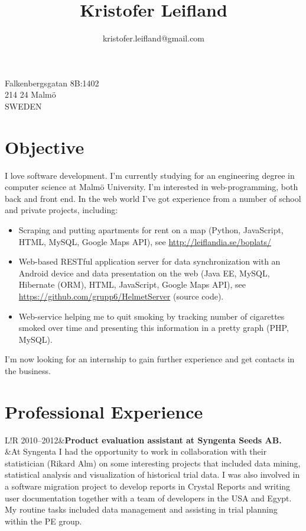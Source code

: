 \documentclass[10pt]{article}
\title{\bfseries\Huge Kristofer Leifland}
\author{kristofer.leifland@gmail.com}
\date{}
\newcommand\VRule{\color{lightgray}\vrule width 0.5pt}
\begin{document}
\maketitle
\thispagestyle{empty}
\pagestyle{empty}
\begin{minipage}[ht]{0.48\textwidth}
Falkenbergsgatan 8B:1402\\
214 24 Malmö\\
SWEDEN
\end{minipage}


\section*{Objective}
I love software development. I'm currently studying for an engineering degree in computer science at Malmö University. I'm interested in web-programming, both back and front end. In the web world I've got experience from a number of school and private projects, including:
\begin{itemize}
\item Scraping and putting apartments for rent on a map (Python, JavaScript, HTML, MySQL, Google Maps API), see \url{http://leiflandia.se/boplats/}
\item Web-based RESTful application server for data synchronization with an Android device and data presentation on the web (Java EE, MySQL, Hibernate (ORM), HTML, JavaScript, Google Maps API), see \url{https://github.com/grupp6/HelmetServer} (source code).
\item Web-service helping me to quit smoking by tracking number of cigarettes smoked over time and presenting this information in a pretty graph (PHP, MySQL).
\end{itemize}
I'm now looking for an internship to gain further experience and get contacts in the business.

\section*{Professional Experience}
\begin{tabular}{L!{\VRule}R}
2010--2012&{\bf Product evaluation assistant at Syngenta Seeds AB.}\\
&At Syngenta I had the opportunity to work in collaboration with their statistician (Rikard Alm) on some interesting projects that included data mining, statistical analysis and visualization of historical trial data. I was also involved in a software migration project to develop reports in Crystal Reports and writing user documentation together with a team of developers in the USA and Egypt. My routine tasks included data management and assisting in trial planning within the PE group.\\
\end{tabular}
\end{document}
